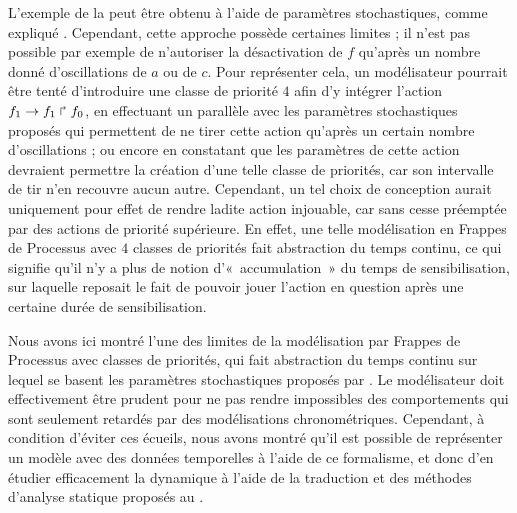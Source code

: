 \begin{example}
  L'exemple de la 
  peut être obtenu à l'aide de paramètres stochastiques,
  comme expliqué .
  Cependant, cette approche possède certaines limites ;
  il n'est pas possible par exemple de n'autoriser la désactivation de $f$
  qu'après un nombre donné d'oscillations de $a$ ou de $c$.
  Pour représenter cela, un modélisateur pourrait être tenté d'introduire une classe de
  priorité $4$ afin d'y intégrer l'action $f_1\rightarrow f_1\Rsh f_0$,
  en effectuant un parallèle avec les paramètres stochastiques proposés
  qui permettent de ne tirer cette action qu'après un certain nombre d'oscillations ;
  ou encore en constatant que les paramètres de cette action devraient permettre
  la création d'une telle classe de priorités, car son intervalle de tir n'en recouvre
  aucun autre.
  Cependant, un tel choix de conception aurait uniquement pour effet de rendre ladite action
  injouable, car sans cesse préemptée par des actions de priorité supérieure.
  En effet, une telle modélisation en Frappes de Processus avec $4$ classes de priorités
  fait abstraction du temps continu,
  ce qui signifie qu'il n'y a plus de notion d'«~accumulation~» du temps de sensibilisation,
  sur laquelle reposait le fait de pouvoir jouer l'action en question après une certaine
  durée de sensibilisation.
\end{example}

Nous avons ici montré l'une des limites de la modélisation par
Frappes de Processus avec classes de priorités, qui fait abstraction du temps
continu sur lequel se basent les paramètres stochastiques proposés par .
Le modélisateur doit effectivement être prudent pour ne pas rendre impossibles des
comportements qui sont seulement retardés par des modélisations chronométriques.
Cependant, à condition d'éviter ces écueils, nous avons montré qu'il est possible
de représenter un modèle avec des données temporelles à l'aide de ce formalisme,
et donc d'en étudier efficacement la dynamique à l'aide
de la traduction et des méthodes d'analyse statique proposés au .
